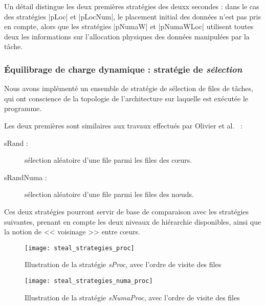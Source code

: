Un détail distingue les deux premières stratégies des deuxx secondes : dans le cas des stratégies |pLoc| et |pLocNum|, le placement initial des données n'est pas pris en compte, alors que les stratégies |pNumaW| et |pNumaWLoc| utilisent toutes deux les informations sur l'allocation physiques des données manipulées par la tâche.

\subsubsection{Équilibrage de charge dynamique : stratégie de \emph{sélection}}
\label{sec:openmp:runtime:select}


Nous avons implémenté un ensemble de stratégie de sélection de files de tâches, qui ont conscience de la topologie de l'architecture sur laquelle est exécutée le programme.

Les deux premières sont similaires aux travaux effectués par Olivier et al.~\cite{Olivier2012} :
\begin{description}
  \item [sRand :] sélection aléatoire d'une file parmi les files des cœurs.
  \item [sRandNuma :] sélection aléatoire d'une file parmi les files des nœuds.
\end{description}

Ces deux stratégies pourront servir de base de comparaison avec les stratégies suivantes, prenant en compte les deux niveaux de hiérarchie disponibles, ainsi que la notion de << voisinage >> entre cœurs.

\begin{figure}[t!]
  \centering
  \texttt{[image: steal\_strategies\_proc]}
  \caption{Illustration de la stratégie \emph{sProc}, avec l'ordre de visite des files}\label{fig:openmp:runtime:steal_proc}
\end{figure}

\begin{figure}[h!]
  \centering
  \texttt{[image: steal\_strategies\_numa\_proc]}
  \caption{Illustration de la stratégie \emph{sNumaProc}, avec l'ordre de visite des files}\label{fig:openmp:runtime:steal_numa_proc}
\end{figure}

